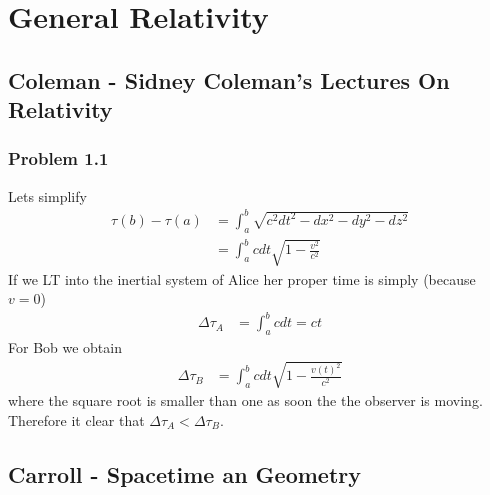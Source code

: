 \documentclass[10pt,a4paper]{article}
\theoremstyle{definition}
\begin{document}
\newpage
\section{General Relativity}

\subsection{{\sc Coleman} - Sidney Coleman’s Lectures On Relativity}
\subsubsection{Problem 1.1}
Lets simplify
\begin{align}
\tau(b)-\tau(a)&=\int_a^b\sqrt{c^2dt^2-dx^2-dy^2-dz^2}\\
&=\int_a^bcdt\sqrt{1-\frac{v^2}{c^2}}
\end{align}
If we LT into the inertial system of Alice her proper time is simply (because $v=0$)
\begin{align}
\Delta\tau_A&=\int_a^bcdt=ct
\end{align}
For Bob we obtain
\begin{align}
\Delta\tau_B&=\int_a^bcdt\sqrt{1-\frac{v(t)^2}{c^2}}
\end{align}
where the square root is smaller than one as soon the the observer is moving. Therefore it clear that $\Delta\tau_A<\Delta\tau_B$.


\subsection{{\sc Carroll} - Spacetime an Geometry}
\end{document}
